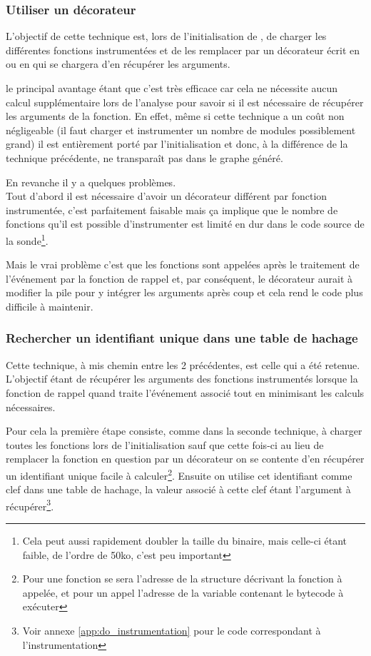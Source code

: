 \subsubsection*{Utiliser un décorateur}
L'objectif de cette technique est, lors de l'initialisation de \Blackfire, de charger les différentes fonctions instrumentées et de les remplacer par un décorateur écrit en \C ou en \Python qui se chargera d'en récupérer les arguments.

le principal avantage étant que c'est très efficace car cela ne nécessite aucun calcul supplémentaire lors de l'analyse pour savoir si il est nécessaire de récupérer les arguments de la fonction. En effet, même si cette technique a un coût non négligeable (il faut charger et instrumenter un nombre de modules possiblement grand) il est entièrement porté par l'initialisation et donc, à la différence de la technique précédente, ne transparaît pas dans le graphe généré.

En revanche il y a quelques problèmes. \\
Tout d'abord il est nécessaire d'avoir un décorateur différent par fonction instrumentée, c'est parfaitement faisable mais ça implique que le nombre de fonctions qu'il est possible d'instrumenter est limité en dur dans le code source de la sonde\footnote{Cela peut aussi rapidement doubler la taille du binaire, mais celle-ci étant faible, de l'ordre de 50ko, c'est peu important}.
 
Mais le vrai problème c'est que les fonctions sont appelées après le traitement de l'événement par la fonction de rappel et, par conséquent, le décorateur aurait à modifier la pile pour y intégrer les arguments après coup et cela rend le code plus difficile à maintenir.

\subsubsection*{Rechercher un identifiant unique dans une table de hachage}
Cette technique, à mis chemin entre les 2 précédentes, est celle qui a été retenue. L'objectif étant de récupérer les arguments des fonctions instrumentés lorsque la fonction de rappel quand traite l'événement associé tout en minimisant les calculs nécessaires.

Pour cela la première étape consiste, comme dans la seconde technique, à charger toutes les fonctions lors de l’initialisation sauf que cette fois-ci au lieu de remplacer la fonction en question par un décorateur on se contente d'en récupérer un identifiant unique facile à calculer\footnote{Pour une fonction \C se sera l'adresse de la structure décrivant la fonction \C à appelée, et pour un appel \Python l'adresse de la variable contenant le bytecode à exécuter}. Ensuite on utilise cet identifiant comme clef dans une table de hachage, la valeur associé à cette clef étant l'argument à récupérer\footnote{Voir annexe \vref{app:do_instrumentation} pour le code correspondant à l'instrumentation}.

